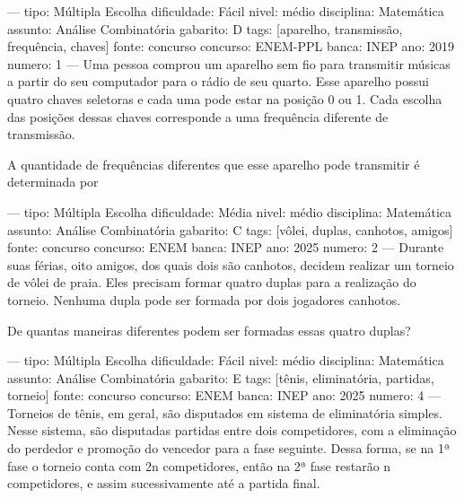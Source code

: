 
---
tipo: Múltipla Escolha
dificuldade: Fácil
nivel: médio
disciplina: Matemática
assunto: Análise Combinatória
gabarito: D
tags: [aparelho, transmissão, frequência, chaves]
fonte: concurso
concurso: ENEM-PPL
banca: INEP
ano: 2019
numero: 1
---
\question
Uma pessoa comprou um aparelho sem fio para transmitir músicas a partir do seu computador para o rádio de seu quarto. Esse aparelho possui quatro chaves seletoras e cada uma pode estar na posição 0 ou 1. Cada escolha das posições dessas chaves corresponde a uma frequência diferente de transmissão.

A quantidade de frequências diferentes que esse aparelho pode transmitir é determinada por
\begin{oneparchoices}
\end{oneparchoices}

---
tipo: Múltipla Escolha
dificuldade: Média
nivel: médio
disciplina: Matemática
assunto: Análise Combinatória
gabarito: C
tags: [vôlei, duplas, canhotos, amigos]
fonte: concurso
concurso: ENEM
banca: INEP
ano: 2025
numero: 2
---
\question
Durante suas férias, oito amigos, dos quais dois são canhotos, decidem realizar um torneio de vôlei de praia. Eles precisam formar quatro duplas para a realização do torneio. Nenhuma dupla pode ser formada por dois jogadores canhotos.

De quantas maneiras diferentes podem ser formadas essas quatro duplas?
\begin{oneparchoices}
\end{oneparchoices}

---
tipo: Múltipla Escolha
dificuldade: Fácil
nivel: médio
disciplina: Matemática
assunto: Análise Combinatória
gabarito: E
tags: [tênis, eliminatória, partidas, torneio]
fonte: concurso
concurso: ENEM
banca: INEP
ano: 2025
numero: 4
---
\question
Torneios de tênis, em geral, são disputados em sistema de eliminatória simples. Nesse sistema, são disputadas partidas entre dois competidores, com a eliminação do perdedor e promoção do vencedor para a fase seguinte. Dessa forma, se na 1ª fase o torneio conta com 2n competidores, então na 2ª fase restarão n competidores, e assim sucessivamente até a partida final.

